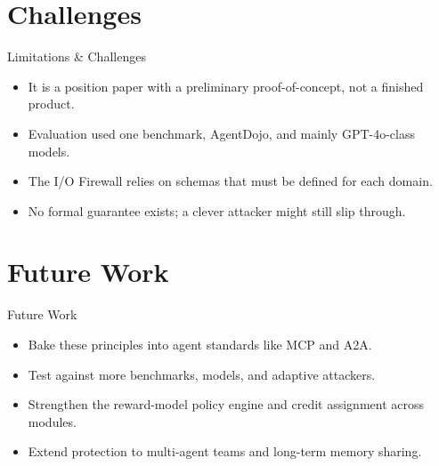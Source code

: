 \documentclass[10pt]{beamer}
\begin{document}
\section{Challenges}
\begin{frame}{Limitations \& Challenges}
\begin{itemize}
  \item It is a position paper with a preliminary proof-of-concept, not a finished product.
  \item Evaluation used one benchmark, AgentDojo, and mainly GPT-4o-class models.
  \item The I/O Firewall relies on schemas that must be defined for each domain.
  \item No formal guarantee exists; a clever attacker might still slip through.
\end{itemize}
\end{frame}
\section{Future Work}
\begin{frame}{Future Work}
\begin{itemize}
  \item Bake these principles into agent standards like MCP and A2A.
  \item Test against more benchmarks, models, and adaptive attackers.
  \item Strengthen the reward-model policy engine and credit assignment across modules.
  \item Extend protection to multi-agent teams and long-term memory sharing.
\end{itemize}
\end{frame}
\end{document}

